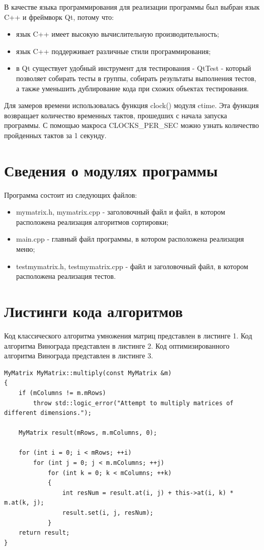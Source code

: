 \documentclass[a4paper,14pt]{report}
\begin{document}
В качестве языка программирования для реализации программы был выбран язык C++ и фреймворк Qt, потому что:
\begin{itemize}
	\item язык C++ имеет высокую вычислительную производительность;
	\item язык C++ поддерживает различные стили программирования;
	\item в Qt существует удобный инструмент для тестирования - QtTest - который позволяет собирать тесты в группы, собирать результаты выполнения тестов, а также уменьшить дублирование кода при схожих объектах тестирования.
\end{itemize}

Для замеров времени использовалась функция clock() модуля ctime. Эта функция возвращает количество временных тактов, прошедших с начала запуска программы. С помощью макроса CLOCKS\_PER\_SEC можно узнать количество пройденных тактов за 1 секунду.

\section*{Сведения о модулях программы}

Программа состоит из следующих файлов:
\begin{itemize}
	\item mymatrix.h, mymatrix.cpp - заголовочный файл и файл, в котором расположена реализация алгоритмов сортировки;
	\item main.cpp - главный файл программы, в котором расположена реализация меню;
	\item testmymatrix.h, testmymatrix.cpp - файл и заголовочный файл, в котором расположена реализация тестов.
\end{itemize}


\section*{Листинги кода алгоритмов}

Код классического алгоритма умножения матриц представлен в листинге 1. Код алгоритма Винограда представлен в листинге 2. Код оптимизированного алгоритма Винограда представлен в листинге 3.

\begin{lstlisting}[label=some-code,caption=Классический алгоритм умножения матриц]
MyMatrix MyMatrix::multiply(const MyMatrix &m)
{
    if (mColumns != m.mRows)
        throw std::logic_error("Attempt to multiply matrices of different dimensions.");

    MyMatrix result(mRows, m.mColumns, 0);

    for (int i = 0; i < mRows; ++i)
        for (int j = 0; j < m.mColumns; ++j)
            for (int k = 0; k < mColumns; ++k)
            {
                int resNum = result.at(i, j) + this->at(i, k) * m.at(k, j);
                result.set(i, j, resNum);
            }
    return result;
}
\end{lstlisting}
\end{document}

